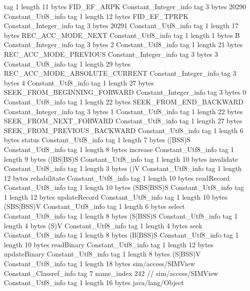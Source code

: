 {{{			tag	1
			length	11
			bytes	FID_EF_ARPK
		}
		Constant_Integer_info {
			tag	3
			bytes	20290
		}
		Constant_Utf8_info {
			tag	1
			length	12
			bytes	FID_EF_TPRPK
		}
		Constant_Integer_info {
			tag	3
			bytes	20291
		}
		Constant_Utf8_info {
			tag	1
			length	17
			bytes	REC_ACC_MODE_NEXT
		}
		Constant_Utf8_info {
			tag	1
			length	1
			bytes	B
		}
		Constant_Integer_info {
			tag	3
			bytes	2
		}
		Constant_Utf8_info {
			tag	1
			length	21
			bytes	REC_ACC_MODE_PREVIOUS
		}
		Constant_Integer_info {
			tag	3
			bytes	3
		}
		Constant_Utf8_info {
			tag	1
			length	29
			bytes	REC_ACC_MODE_ABSOLUTE_CURRENT
		}
		Constant_Integer_info {
			tag	3
			bytes	4
		}
		Constant_Utf8_info {
			tag	1
			length	27
			bytes	SEEK_FROM_BEGINNING_FORWARD
		}
		Constant_Integer_info {
			tag	3
			bytes	0
		}
		Constant_Utf8_info {
			tag	1
			length	22
			bytes	SEEK_FROM_END_BACKWARD
		}
		Constant_Integer_info {
			tag	3
			bytes	1
		}
		Constant_Utf8_info {
			tag	1
			length	22
			bytes	SEEK_FROM_NEXT_FORWARD
		}
		Constant_Utf8_info {
			tag	1
			length	27
			bytes	SEEK_FROM_PREVIOUS_BACKWARD
		}
		Constant_Utf8_info {
			tag	1
			length	6
			bytes	status
		}
		Constant_Utf8_info {
			tag	1
			length	7
			bytes	([BSS)S
		}
		Constant_Utf8_info {
			tag	1
			length	8
			bytes	increase
		}
		Constant_Utf8_info {
			tag	1
			length	9
			bytes	([BS[BS)S
		}
		Constant_Utf8_info {
			tag	1
			length	10
			bytes	invalidate
		}
		Constant_Utf8_info {
			tag	1
			length	3
			bytes	()V
		}
		Constant_Utf8_info {
			tag	1
			length	12
			bytes	rehabilitate
		}
		Constant_Utf8_info {
			tag	1
			length	10
			bytes	readRecord
		}
		Constant_Utf8_info {
			tag	1
			length	10
			bytes	(SBS[BSS)S
		}
		Constant_Utf8_info {
			tag	1
			length	12
			bytes	updateRecord
		}
		Constant_Utf8_info {
			tag	1
			length	10
			bytes	(SBS[BSS)V
		}
		Constant_Utf8_info {
			tag	1
			length	6
			bytes	select
		}
		Constant_Utf8_info {
			tag	1
			length	8
			bytes	(S[BSS)S
		}
		Constant_Utf8_info {
			tag	1
			length	4
			bytes	(S)V
		}
		Constant_Utf8_info {
			tag	1
			length	4
			bytes	seek
		}
		Constant_Utf8_info {
			tag	1
			length	8
			bytes	(B[BSS)S
		}
		Constant_Utf8_info {
			tag	1
			length	10
			bytes	readBinary
		}
		Constant_Utf8_info {
			tag	1
			length	12
			bytes	updateBinary
		}
		Constant_Utf8_info {
			tag	1
			length	8
			bytes	(S[BSS)V
		}
		Constant_Utf8_info {
			tag	1
			length	18
			bytes	sim/access/SIMView
		}
		Constant_Classref_info {
			tag	7
			name_index	242		// sim/access/SIMView
		}
		Constant_Utf8_info {
			tag	1
			length	16
			bytes	java/lang/Object
}}}
